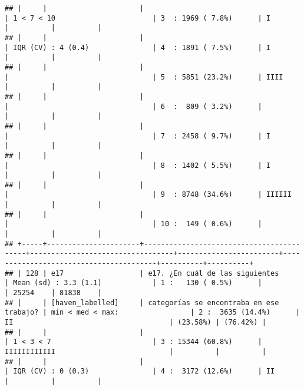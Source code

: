 \documentclass[]{article}
\begin{document}
\begin{verbatim}
## |     |                      |                                          | 1 < 7 < 10                       | 3  : 1969 ( 7.8%)      | I                                      |          |          |
## |     |                      |                                          | IQR (CV) : 4 (0.4)               | 4  : 1891 ( 7.5%)      | I                                      |          |          |
## |     |                      |                                          |                                  | 5  : 5851 (23.2%)      | IIII                                   |          |          |
## |     |                      |                                          |                                  | 6  :  809 ( 3.2%)      |                                        |          |          |
## |     |                      |                                          |                                  | 7  : 2458 ( 9.7%)      | I                                      |          |          |
## |     |                      |                                          |                                  | 8  : 1402 ( 5.5%)      | I                                      |          |          |
## |     |                      |                                          |                                  | 9  : 8748 (34.6%)      | IIIIII                                 |          |          |
## |     |                      |                                          |                                  | 10 :  149 ( 0.6%)      |                                        |          |          |
## +-----+----------------------+------------------------------------------+----------------------------------+------------------------+----------------------------------------+----------+----------+
## | 128 | e17                  | e17. ¿En cuál de las siguientes          | Mean (sd) : 3.3 (1.1)            | 1 :   130 ( 0.5%)      |                                        | 25254    | 81838    |
## |     | [haven_labelled]     | categorías se encontraba en ese trabajo? | min < med < max:                 | 2 :  3635 (14.4%)      | II                                     | (23.58%) | (76.42%) |
## |     |                      |                                          | 1 < 3 < 7                        | 3 : 15344 (60.8%)      | IIIIIIIIIIII                           |          |          |
## |     |                      |                                          | IQR (CV) : 0 (0.3)               | 4 :  3172 (12.6%)      | II                                     |          |          |

\end{verbatim}
\end{document}

